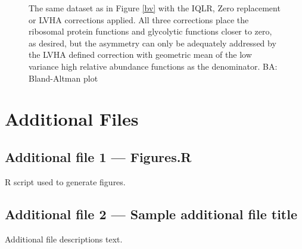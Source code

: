 \documentclass{bmcart}
\def\texttt{[image: ]}
\begin{document}
\begin{backmatter}
\begin{figure}[ht]
\caption{ The same dataset as in Figure \ref{bv} with the IQLR, Zero replacement or LVHA corrections applied. All three corrections place the ribosomal protein functions and glycolytic functions closer to zero, as desired, but the asymmetry can only be adequately addressed by the LVHA defined correction with geometric mean of the low variance high relative abundance functions as the denominator. BA: Bland-Altman plot }
\label{Fig:ribo}
\end{figure}



\section*{Additional Files}
  \subsection*{Additional file 1 --- Figures.R}
    R script used to generate figures. 

  \subsection*{Additional file 2 --- Sample additional file title}
    Additional file descriptions text.


\end{backmatter}
\end{document}
